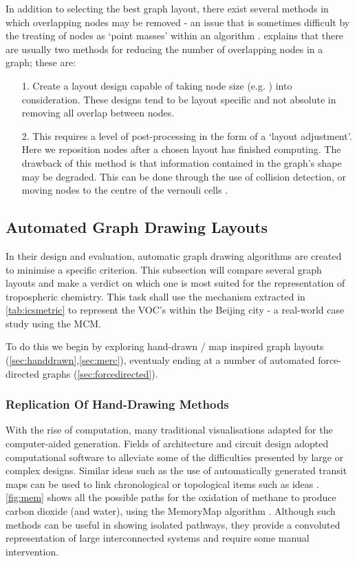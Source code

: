 In addition to selecting the best graph layout, there exist several methods in which overlapping nodes may be removed - an issue that is sometimes difficult by the treating of nodes as `point masses' within an algorithm \citep{nodeoverlap}. \cite{IPSEPCOLA} explains that there are usually two methods for reducing the number of overlapping nodes in a graph; these are:


\begin{itemize}
\item [1.] Create a layout design capable of taking node size (e.g. \citep{nons}) into consideration. These designs tend to be layout specific and not absolute in removing all overlap between nodes.
\item [2.] This requires a level of post-processing in the form of a `layout adjustment'. Here we reposition nodes after a chosen layout has finished computing. The drawback of this method is that information contained in the graph's shape may be degraded. This can be done through the use of collision detection, or moving nodes to the centre of the vernouli cells \citep{novern}.
\end{itemize}




\subsection{Automated Graph Drawing Layouts}\label{sec:drawing}


In their design and evaluation, automatic graph drawing algorithms are created to minimise a specific criterion. This subsection will compare several graph layouts and make a verdict on which one is most suited for the representation of tropospheric chemistry. This task shall use the mechanism extracted in \autoref{tab:icsmetric} to represent the VOC's within the Beijing city - a real-world case study using the MCM.

To do this we begin by exploring hand-drawn / map inspired graph layouts \\ (\autoref{sec:handdrawn},\autoref{sec:merc}), eventualy ending at a number of  automated force-directed graphs (\autoref{sec:forcedirected}).


\subsubsection{Replication Of Hand-Drawing Methods}\label{sec:handdrawn}
With the rise of computation, many traditional visualisations adapted for the computer-aided generation. Fields of architecture and circuit design adopted computational software to alleviate some of the difficulties presented by large or complex designs. Similar ideas such as the use of automatically generated transit maps can be used to link chronological or topological items such as ideas \citep{memory}. \autoref{fig:mem} shows all the possible paths for the oxidation of methane to produce carbon dioxide (and water), using the MemoryMap algorithm \cite{memory}. Although such methods can be useful in showing isolated pathways, they provide a convoluted representation of large interconnected systems and require some manual intervention.


